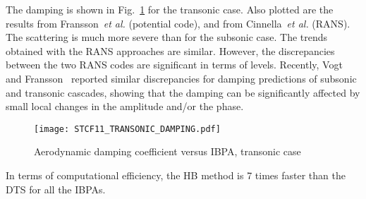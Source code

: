 The damping is shown in Fig.~\ref{fig:stcf11_transonic_damping} for
the transonic case. Also plotted are the results from
Fransson~\emph{et al.} (potential code), and 
from Cinnella~\emph{et al.} (RANS). The scattering is much more severe
than for the subsonic case. The trends obtained with the RANS approaches are similar. However, the
discrepancies between the two RANS codes are significant in terms of
levels.
Recently, Vogt and Fransson~\cite{Vogt:2011fk} reported similar discrepancies 
for damping predictions of subsonic and transonic cascades, 
showing that the damping can be significantly affected by 
small local changes in the amplitude and/or the phase.
\begin{figure}[htb]
  \centering
  \texttt{[image: STCF11\_TRANSONIC\_DAMPING.pdf]}
  \caption{Aerodynamic damping coefficient versus IBPA, transonic
    case}
  \label{fig:stcf11_transonic_damping}
\end{figure}
In terms of computational efficiency, the HB method is 7 times faster
than the DTS  for all the IBPAs.


